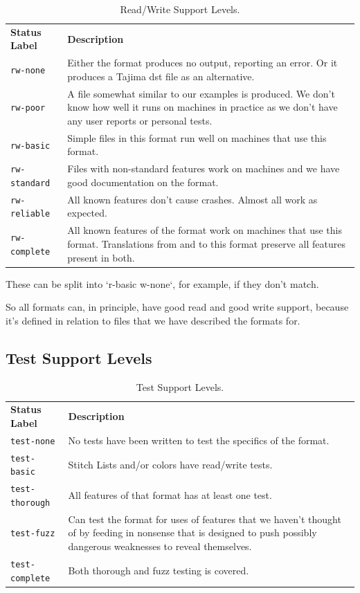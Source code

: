 \documentclass[11pt]{report}
\begin{document}
\begin{longtable}{p{4cm} p{8cm}}
\caption{Read/Write Support Levels.}
\label{tab:read-write-support} \\
\textbf{Status Label} &
\textbf{Description} \\

\texttt{rw-none} &
Either the format produces no output, reporting an error. Or it produces a
Tajima dst file as an alternative. \\

\texttt{rw-poor} &
A file somewhat similar to our examples is produced. We don't know how well
it runs on machines in practice as we don't have any user reports or personal
tests. \\

\texttt{rw-basic} &
Simple files in this format run well on machines that use this format. \\

\texttt{rw-standard} &
Files with non-standard features work on machines and we have good documentation
on the format. \\

\texttt{rw-reliable} &
All known features don't cause crashes. Almost all work as expected. \\

\texttt{rw-complete} &
All known features of the format work on machines that use this format.
Translations from and to this format preserve all features present in both.
\end{longtable}

These can be split into `r-basic w-none`, for example, if they don't match.

So all formats can, in principle, have good read and good write support, because it's defined in relation to files that we have described the formats for.

\subsection{Test Support Levels}

\begin{longtable}{p{4cm} p{8cm}}
\caption{Test Support Levels.}
\label{tab:test-support} \\
\textbf{Status Label} &
\textbf{Description} \\

\texttt{test-none} &
No tests have been written to test the specifics of the format. \\

\texttt{test-basic} &
Stitch Lists and/or colors have read/write tests. \\

\texttt{test-thorough} &
All features of that format has at least one test. \\

\texttt{test-fuzz} &
Can test the format for uses of features that we haven't thought of by feeding
in nonsense that is designed to push possibly dangerous weaknesses to reveal
themselves. \\

\texttt{test-complete} &
Both thorough and fuzz testing is covered.
\end{longtable}
\end{document}
